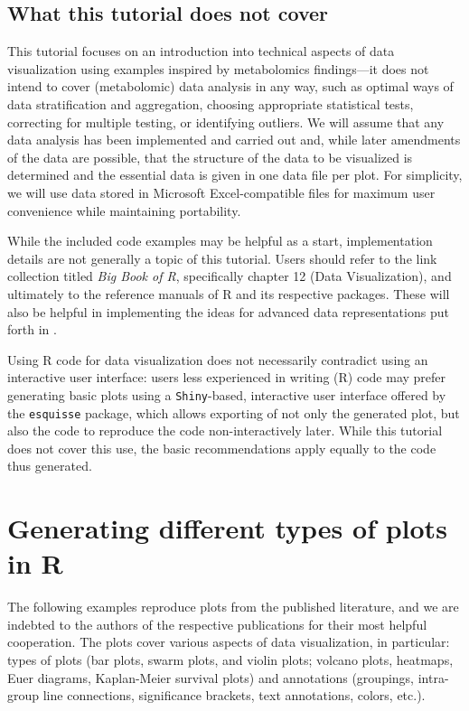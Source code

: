 \documentclass[AMA,LATO1COL]{WileyNJD-v2}
\begin{document}
\subsection{What this tutorial does not cover}

This tutorial focuses on an introduction into technical aspects of data
visualization using examples inspired by metabolomics findings---it does not
intend to cover (metabolomic) data analysis in any way, such as optimal ways of
 data stratification and aggregation,
choosing appropriate statistical tests, correcting for multiple testing, or
identifying outliers. We will assume that any data analysis has been implemented
and carried out and, while later amendments of the data are possible, that the
structure of the data to be visualized is determined and the essential data is
given in one data file per plot. For simplicity, we will use data stored in
Microsoft Excel-compatible files for maximum user convenience while maintaining
portability.

While the included code examples may be helpful as a start, implementation
details are not generally a topic of this tutorial. Users should refer to the
link collection titled \textit{Big Book of R}, specifically chapter 12 (Data
Visualization), \cite{BigBookOfR} and ultimately to the reference manuals of R
and its respective packages. These will also be helpful in implementing the
ideas for advanced data representations put forth in .

Using R code for data visualization does not necessarily contradict using an
interactive user interface: users less experienced in writing (R) code may
prefer generating basic plots using a \texttt{Shiny}-based, interactive user
interface offered by the \texttt{esquisse} package, which allows exporting of
not only the generated plot, but also the code to reproduce the code
non-interactively later. While this tutorial does not cover this use, the basic
recommendations apply equally to the code thus generated.

\section{Generating different types of plots in R}

The following examples reproduce plots from the published literature, and we are
indebted to the authors of the respective publications for their most helpful
cooperation. The plots cover various aspects of data visualization, in
particular: types of plots (bar plots, swarm plots, and violin plots; volcano
plots, heatmaps, Euer diagrams, Kaplan-Meier survival plots) and annotations
(groupings, intra-group line connections, significance brackets, text
annotations, colors, etc.).
\end{document}
